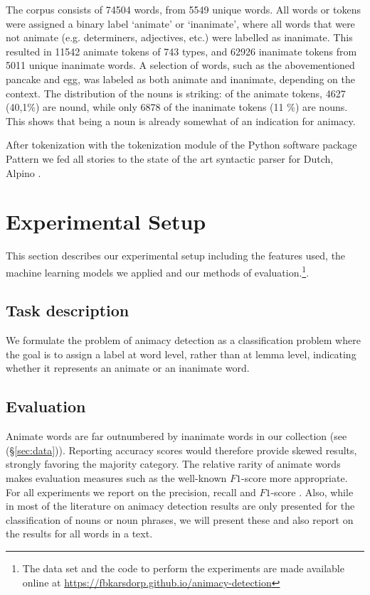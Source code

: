 \documentclass[a4paper,UKenglish]{oasics}
\begin{document}
The corpus consists of 74504 words, from 5549 unique words. All words or tokens were assigned a binary label `animate' or `inanimate', where all words that were not animate (e.g. determiners, adjectives, etc.) were labelled as inanimate. This resulted in 11542 animate tokens of 743 types, and 62926 inanimate tokens from 5011 unique inanimate words. A selection of words, such as the abovementioned pancake and egg, was labeled as both animate and inanimate, depending on the context. The distribution of the nouns is striking: of the animate tokens, 4627 (40,1\%) are nound, while only 6878 of the inanimate tokens (11 \%) are nouns. This shows that being a noun is already somewhat of an indication for animacy. 


After tokenization with the tokenization module of the Python software
package Pattern \cite{smedt:12} we fed all stories to the
state of the art syntactic parser for Dutch, Alpino \cite{bouma:01}. 


\section{Experimental Setup}\label{sec:models}
This section describes our experimental setup including the features
used, the machine learning models we applied and our methods of
evaluation.\footnote{The data set and the code to perform the
  experiments are made available online at
  \url{https://fbkarsdorp.github.io/animacy-detection}}.

\subsection{Task description}

We formulate the problem of animacy detection as a classification
problem where the goal is to assign a label at word level, rather than at lemma level,
indicating whether it represents an animate or an inanimate word.

\subsection{Evaluation}

Animate words are far outnumbered by inanimate words in our
collection (see (\S\ref{sec:data})). Reporting accuracy scores would therefore provide skewed
results, strongly favoring the majority category. The relative rarity of
animate words makes evaluation measures such as the well-known $F1$-score
more appropriate. For all experiments we report on the precision,
recall and $F1$-score \cite{rijsbergen:79}. Also, while in most of the literature on animacy detection results are only presented for the classification of nouns or noun phrases, we will present these and also report on the results for all words in a
text.
\end{document}
